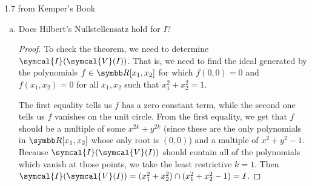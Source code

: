 \begin{problem*}{1.7 from Kemper's Book}
\begin{enumerate}[(a)]
    \item Does Hilbert's Nullstellensatz hold for \(I\)?
    \begin{proof}
    To check the theorem, we need to determine \(\symcal{I}(\symcal{V}(I))\). That is, we need to find the ideal generated by the polynomials \(f \in \reals[x_1, x_2]\) for which \(f(0, 0) = 0\) and \(f(x_1, x_2) = 0\) for all \(x_1, x_2\) such that \(x_1^2 + x_2^2 = 1\).
    
    The first equality tells us \(f\) has a zero constant term, while the second one tells us \(f\) vanishes on the unit circle. From the first equality, we get that \(f\) should be a multiple of some \(x^{2k} + y^{2k}\) (since these are the only polynomials in \(\reals[x_1, x_2]\) whose only root is \((0, 0)\)) and a multiple of \(x^2 + y^2 - 1\). Because \(\symcal{I}(\symcal{V}(I))\) should contain all of the polynomials which vanish at those points, we take the least restrictive \(k = 1\). Then \(\symcal{I}(\symcal{V}(I)) = (x_1^2 + x_2^2) \cap (x_1^2 + x_2^2 - 1) = I\).
    \end{proof}
\end{enumerate}
\end{problem*}

